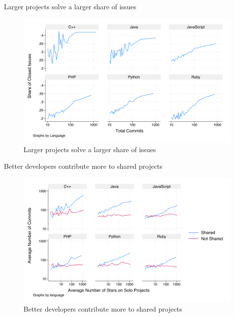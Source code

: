 \documentclass[
  ignorenonframetext,
  aspectratio=1610,
]{beamer}
\begin{document}
\begin{frame}{Larger projects solve a larger share of issues}
\label{larger-projects-solve-a-larger-share-of-issues}
\begin{figure}
\centering
\includegraphics{figures/share_closed_by_commits.png}
\caption{Larger projects solve a larger share of issues}
\end{figure}
\end{frame}

\begin{frame}{Better developers contribute more to shared projects}
\label{better-developers-contribute-more-to-shared-projects}
\begin{figure}
\centering
\includegraphics{figures/avg_n_commits_by_quality.png}
\caption{Better developers contribute more to shared projects}
\end{figure}
\end{frame}
\end{document}
